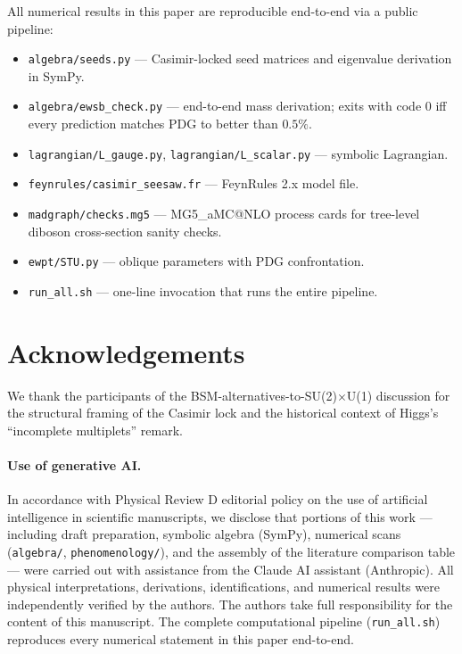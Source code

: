 \documentclass[11pt,a4paper]{article}
\begin{document}
All numerical results in this paper are reproducible end-to-end via a
public pipeline:
\begin{itemize}
\item \texttt{algebra/seeds.py} --- Casimir-locked seed matrices and
   eigenvalue derivation in SymPy.
\item \texttt{algebra/ewsb\_check.py} --- end-to-end mass derivation;
   exits with code 0 iff every prediction matches PDG to better than
   $0.5\%$.
\item \texttt{lagrangian/L\_gauge.py}, \texttt{lagrangian/L\_scalar.py}
   --- symbolic Lagrangian.
\item \texttt{feynrules/casimir\_seesaw.fr} --- FeynRules 2.x model file.
\item \texttt{madgraph/checks.mg5} --- MG5\_aMC@NLO process cards for
   tree-level diboson cross-section sanity checks.
\item \texttt{ewpt/STU.py} --- oblique parameters with PDG confrontation.
\item \texttt{run\_all.sh} --- one-line invocation that runs the entire
   pipeline.
\end{itemize}

\section*{Acknowledgements}

We thank the participants of the BSM-alternatives-to-SU(2)$\times$U(1)
discussion for the structural framing of the Casimir lock and the
historical context of Higgs's ``incomplete multiplets'' remark.

\paragraph{Use of generative AI.} In accordance with Physical Review D
editorial policy on the use of artificial intelligence in scientific
manuscripts, we disclose that portions of this work --- including
draft preparation, symbolic algebra (SymPy), numerical scans
(\texttt{algebra/}, \texttt{phenomenology/}), and the assembly of
the literature comparison table --- were carried out with assistance
from the Claude AI assistant (Anthropic). All physical interpretations,
derivations, identifications, and numerical results were independently
verified by the authors. The authors take full responsibility for the
content of this manuscript. The complete computational pipeline
(\texttt{run\_all.sh}) reproduces every numerical statement in this
paper end-to-end.



\end{document}
